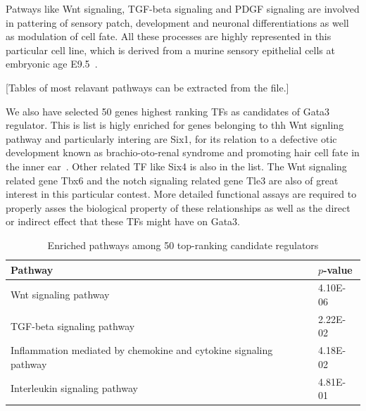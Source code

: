 \documentclass{article}
\begin{document}
Patways like Wnt signaling, TGF-beta signaling and PDGF signaling are
involved in pattering of sensory patch, development and neuronal
differentiations as well as modulation of cell fate. All these
processes are highly represented in this particular cell line, which
is derived from a murine sensory epithelial cells at embryonic age
E9.5~\cite{Milo2009}.

[Tables of most relavant pathways can be extracted from the file.]

We also have selected 50 genes highest ranking TFs
as candidates of Gata3 regulator. This is list is
higly enriched for genes belonging to thh Wnt signling pathway and
particularly intering are Six1, for its relation to a defective otic
development known as brachio-oto-renal syndrome and promoting hair
cell fate in the inner ear~\cite{Fritzsch2007,Bosman2009}.
Other related TF like Six4 is also in the list. The Wnt
signaling related gene Tbx6 and the notch signaling related gene Tle3
are also of great interest in this particular contest. More detailed
functional assays are required to properly asses the biological
property of these relationships as well as the direct or indirect
effect that these TFs might have on Gata3.

\begin{table}[htb]
  \centering
  \begin{tabularx}{\columnwidth}{Xl}
    Pathway & $p$-value \\
    \hline
Wnt signaling pathway &	4.10E-06 \\
TGF-beta signaling pathway & 2.22E-02 \\
Inflammation mediated by chemokine and cytokine signaling pathway & 4.18E-02 \\
Interleukin signaling pathway & 4.81E-01 \\
  \end{tabularx}
  \caption{Enriched pathways among 50 top-ranking candidate regulators}
  \label{tab:pathways}
\end{table}
\end{document}
